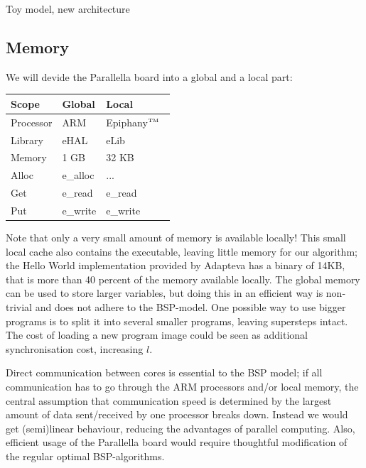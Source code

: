 \documentclass[fleqn]{article}
\renewcommand{\(}{\left(}
\renewcommand{\)}{\right)}
\def\tm{$^{\hbox{\tiny TM}}$~}
\begin{document}
Toy model, new architecture

\subsection{Memory}

We will devide the Parallella board into a global and a local part:

\begin{tabular}{l|ll}
Scope & Global & Local \\
\hline
Processor & ARM & Epiphany\tm \\
Library & eHAL & eLib \\
Memory & 1 GB & 32 KB \\
Alloc & e\_alloc & ... \\
Get & e\_read & e\_read \\
Put & e\_write & e\_write \\

\end{tabular}

Note that only a very small amount of memory is available locally! This small local cache also contains the executable, leaving little memory for our algorithm; the Hello World implementation provided by Adapteva has a binary of 14KB, that is more than 40 percent of the memory available locally. The global memory can be used to store larger variables, but doing this in an efficient way is non-trivial and does not adhere to the BSP-model. One possible way to use bigger programs is to split it into several smaller programs, leaving supersteps intact. The cost of loading a new program image could be seen as additional synchronisation cost, increasing $l$.

Direct communication between cores is essential to the BSP model; if all communication has to go through the ARM processors and/or local memory, the central assumption that communication speed is determined by the largest amount of data sent/received by one processor breaks down. Instead we would get (semi)linear behaviour, reducing the advantages of parallel computing. Also, efficient usage of the Parallella board would require thoughtful modification of the regular optimal BSP-algorithms. 
\end{document}
